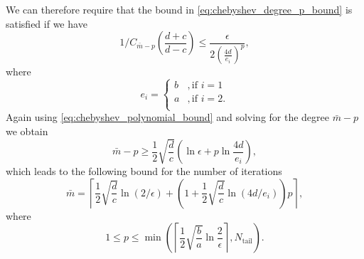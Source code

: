 We can therefore require that the bound in \cref{eq:chebyshev_degree_p_bound} is satisfied if we have
\[
    1/C_{\bar{m}-p}\left(\frac{d+c}{d-c}\right) \leq \frac{\epsilon}{2\left( \frac{4d}{e_i}\right)^p},
\]
where 
\[
    e_i = \begin{cases}
        b &, \text{if } i = 1\\
        a &, \text{if } i = 2.\\
    \end{cases}
\]
Again using \cref{eq:chebyshev_polynomial_bound} and solving for the degree $\bar{m} - p$ we obtain
\[
    \bar{m} - p \geq \frac{1}{2}\sqrt{\frac{d}{c}}\left(\ln{\epsilon} + p \ln{\frac{4d}{e_i}}\right),
\]
which leads to the following bound for the number of iterations \cite[Equation 4.4]{cg_sharpened_convrate_Axelsson1976}
\begin{equation}
    \bar{m}=\left\lceil\frac{1}{2} \sqrt{\frac{d}{c}} \ln (2 / \epsilon)+\left(1+\frac{1}{2} \sqrt{\frac{d}{c}} \ln (4 d / e_i)\right) p\right\rceil,
    \label{eq:cg_iteration_bound_2_clusters}
\end{equation}
where 
\[
    1 \leq p \leq \min\left(\left\lceil\frac{1}{2}\sqrt{\frac{b}{a}}\ln{\frac{2}{\epsilon}} \right\rceil, N_{\text{tail}}\right).
\]

